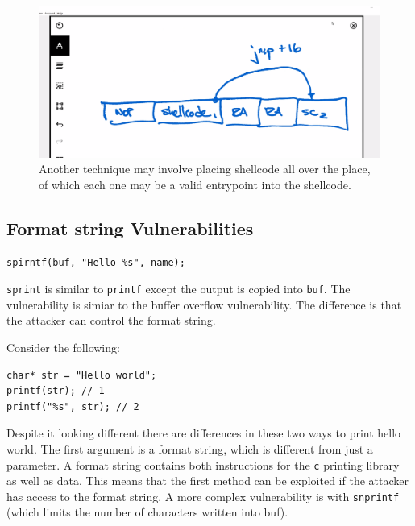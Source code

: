 \documentclass[../notes.tex]{subfiles}
\begin{document}
\begin{figure}[H]
    \centering
    \includegraphics[width=0.8\linewidth]{img/image_2023-01-16-18-40-09.png}
    \caption{Another technique may involve placing shellcode all over the place, of which each one may be a valid entrypoint into the shellcode.}
\end{figure}



\subsection{Format string Vulnerabilities}
\begin{listing}[H]
\begin{verbatim}
spirntf(buf, "Hello %s", name);
\end{verbatim}
\end{listing}


\texttt{sprint} is similar to \texttt{printf} except the output is copied into \texttt{buf}. The vulnerability is simiar to the buffer overflow vulnerability. The difference is that the attacker can control the format string.

Consider the following:

\begin{listing}[H]
\begin{verbatim}
char* str = "Hello world";
printf(str); // 1
printf("%s", str); // 2
\end{verbatim}
\end{listing}

Despite it looking different there are differences in these two ways to print hello world.
The first argument is a format string, which is different from just a parameter.
A format string contains both instructions for the \texttt{c} printing library as well as data.
This means that the first method can be exploited if the attacker has access to the format string.
A more complex vulnerability is with \texttt{snprintf} (which limits the number of characters written into buf).
\end{document}
